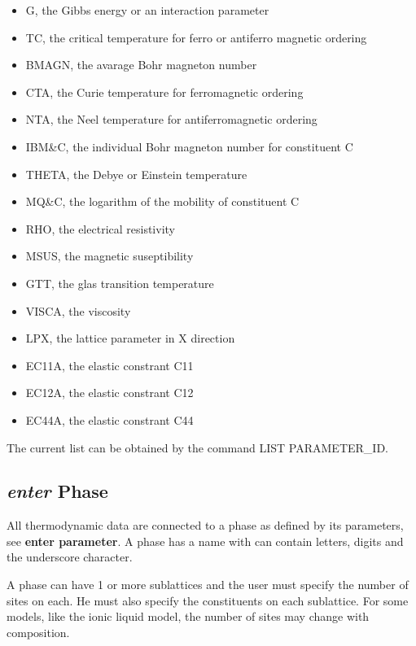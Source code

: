 \documentclass[12pt]{article}
\begin{document}
\begin{itemize}
\item G, the Gibbs energy or an interaction parameter
\item TC, the critical temperature for ferro or antiferro magnetic ordering
\item BMAGN, the avarage Bohr magneton number
\item CTA, the Curie temperature for ferromagnetic ordering
\item NTA, the Neel temperature for antiferromagnetic ordering
\item IBM\&C, the individual Bohr magneton number for constituent C
\item THETA, the Debye or Einstein temperature
\item MQ\&C, the logarithm of the mobility of constituent C
\item RHO, the electrical resistivity
\item MSUS, the magnetic suseptibility
\item GTT, the glas transition temperature
\item VISCA, the viscosity
\item LPX, the lattice parameter in X direction
\item EC11A, the elastic constrant C11
\item EC12A, the elastic constrant C12
\item EC44A, the elastic constrant C44
\end{itemize}

The current list can be obtained by the command LIST PARAMETER\_ID.

\subsection{{\em enter} Phase}

All thermodynamic data are connected to a phase as defined by its
parameters, see {\bf enter parameter}.  A phase has a name with can
contain letters, digits and the underscore character.

A phase can have 1 or more sublattices and the user must specify the
number of sites on each.  He must also specify the constituents on
each sublattice.  For some models, like the ionic liquid model, the
number of sites may change with composition.
\end{document}
